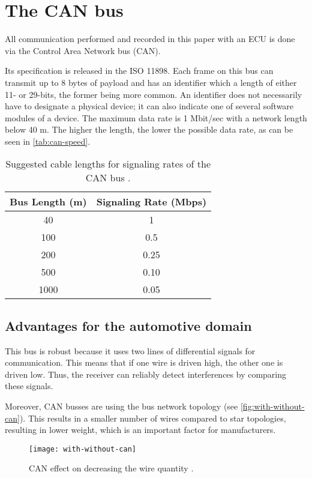 \section{The CAN bus}

All communication performed and recorded in this paper with an ECU is done via the Control Area Network bus (CAN).

 Its specification is released in the ISO 11898. Each frame on this bus can transmit up to 8 bytes of payload and has an identifier which a length of either 11- or 29-bits, the former being more common. An identifier does not necessarily have to designate a physical device; it can also indicate one of several software modules of a device.
 The maximum data rate is 1 Mbit/sec with a network length below 40 m. The higher the length, the lower the possible data rate, as can be seen in \autoref{tab:can-speed}.

\begin{table}[htb]
    \centering
    \begin{tabular}{cc}
    \hline
    \textbf{Bus Length (m)} & \textbf{Signaling Rate (Mbps)}\\
    \hline
    40 & 1 \\
    100 & 0.5 \\
    200 & 0.25 \\
    500 & 0.10 \\
    1000 & 0.05 \\
    \hline
\end{tabular}
\caption{Suggested cable lengths for signaling rates of the CAN bus \cite{slla270}.}
\label{tab:can-speed}
\end{table}

\subsection{Advantages for the automotive domain}

This bus is robust because it uses two lines of differential signals for communication. This means that if one wire is driven high, the other one is driven low. Thus, the receiver can reliably detect interferences by comparing these signals.

Moreover, CAN busses are using the bus network topology (see \autoref{fig:with-without-can}). This results in a smaller number of wires compared to star topologies, resulting in lower weight, which is an important factor for manufacturers.

\begin{figure}[htb]
    \centering
    \texttt{[image: with-without-can]}
    \caption{CAN effect on decreasing the wire quantity \cite{Sharma2016}.}
    \label{fig:with-without-can}
\end{figure}

